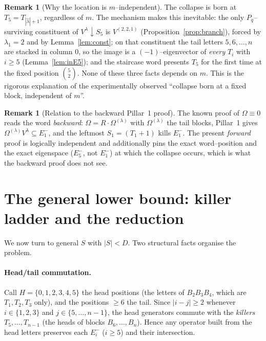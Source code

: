 \documentclass[11pt]{article}
\theoremstyle{definition}
\newtheorem{remark}[theorem]{Remark}
\newcommand{\Pq}{P_{q}}
\newcommand{\la}{\lambda}
\newcommand{\Vl}{V^{\la}}
\newcommand{\Em}[1]{E^{-}_{#1}}
\begin{document}
\begin{remark}[Why the location is $m$--independent]
The collapse is born at $T_5=T_{|\hat\la|+1}$, regardless of $m$. The mechanism makes this
inevitable: the only $\Pq$--surviving constituent of $\Vl\!\downarrow\! S_5$ is
$V^{(2,2,1)}$ (Proposition~\ref{prop:branch}), forced by $\la_1=2$ and by
Lemma~\ref{lem:const}; on that constituent the tail letters $5,6,\dots,n$ are stacked in
column $0$, so the image is a $(-1)$--eigenvector of \emph{every} $T_i$ with $i\ge5$
(Lemma~\ref{lem:inE5}); and the staircase word presents $T_5$ for the first time at the
fixed position $\binom52$. None of these three facts depends on $m$. This is the rigorous
explanation of the experimentally observed ``collapse born at a fixed block, independent
of $m$''.
\end{remark}

\begin{remark}[Relation to the backward Pillar~1 proof]
The known proof of $\Omega\equiv0$ reads the word \emph{backward}: $\Omega=R\cdot
\Omega^{(\la)}$ with $\Omega^{(\la)}$ the tail blocks, Pillar~1 gives
$\Omega^{(\la)}\Vl\subseteq\Em1$, and the leftmost $S_1=(T_1+1)$ kills $\Em1$. The present
\emph{forward} proof is logically independent and additionally pins the exact
word--position and the exact eigenspace ($\Em5$, not $\Em1$) at which the collapse occurs,
which is what the backward proof does not see.
\end{remark}

\section{The general lower bound: killer ladder and the reduction}

We now turn to general $S$ with $|S|<D$. Two structural facts organise the problem.

\paragraph{Head/tail commutation.} Call $H=\{0,1,2,3,4,5\}$ the head positions (the
letters of $B_2B_3B_4$, which are $T_1,T_2,T_3$ only), and the positions $\ge6$ the tail.
Since $|i-j|\ge2$ whenever $i\in\{1,2,3\}$ and $j\in\{5,\dots,n-1\}$, the head generators
commute with the \emph{killers} $T_5,\dots,T_{n-1}$ (the heads of blocks $B_6,\dots,B_n$).
Hence any operator built from the head letters preserves each $\Em i$ ($i\ge5$) and their
intersection.
\end{document}
